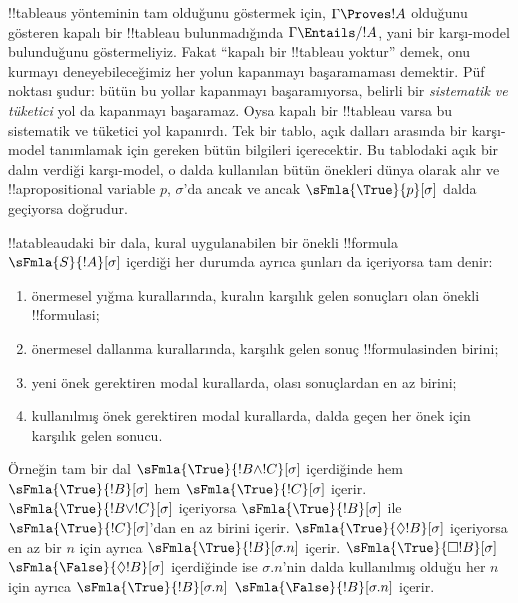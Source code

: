 



\begin{explain}
  !!{tableau}s yönteminin tam olduğunu göstermek için, $\Gamma \Proves !A$
  olduğunu gösteren kapalı bir !!{tableau} bulunmadığında
  $\Gamma \Entails/ !A$, yani bir karşı-model bulunduğunu göstermeliyiz.
  Fakat ``kapalı bir !!{tableau} yoktur'' demek, onu kurmayı deneyebileceğimiz
  her yolun kapanmayı başaramaması demektir. Püf noktası şudur: bütün bu yollar
  kapanmayı başaramıyorsa, belirli bir \emph{sistematik ve tüketici} yol da
  kapanmayı başaramaz. Oysa kapalı bir !!{tableau} varsa bu sistematik ve
  tüketici yol kapanırdı. Tek bir tablo, açık dalları arasında bir karşı-model
  tanımlamak için gereken bütün bilgileri içerecektir. Bu tablodaki açık bir
  dalın verdiği karşı-model, o dalda kullanılan bütün önekleri dünya olarak
  alır ve !!a{propositional variable} $p$, $\sigma$'da ancak ve ancak
  $\sFmla{\True}{p}[\sigma]$ dalda geçiyorsa doğrudur.
\end{explain}

\begin{defn}
  !!a{tableau}{}daki bir dala, kural uygulanabilen bir önekli !!{formula}
  $\sFmla{S}{!A}[\sigma]$ içerdiği her durumda ayrıca şunları da içeriyorsa
  tam denir:
  \begin{enumerate}
    \item önermesel yığma kurallarında, kuralın karşılık gelen sonuçları olan
      önekli !!{formula}s{}i;
    \item önermesel dallanma kurallarında, karşılık gelen sonuç
      !!{formula}s{}inden birini;
    \item yeni önek gerektiren modal kurallarda, olası sonuçlardan en az birini;
    \item kullanılmış önek gerektiren modal kurallarda, dalda geçen her önek
      için karşılık gelen sonucu.
  \end{enumerate}
\end{defn}

\begin{explain}
Örneğin tam bir dal $\sFmla{\True}{!B \land !C}[\sigma]$ içerdiğinde hem
$\sFmla{\True}{!B}[\sigma]$ hem $\sFmla{\True}{!C}[\sigma]$ içerir.
$\sFmla{\True}{!B \lor !C}[\sigma]$ içeriyorsa
$\sFmla{\True}{!B}[\sigma]$ ile $\sFmla{\True}{!C}[\sigma]$'dan en az birini
içerir. 
{$\sFmla{\True}{\Diamond !B}[\sigma]$} içeriyorsa en az bir $n$ için ayrıca
{$\sFmla{\True}{!B}[\sigma.n]$} içerir. 
{$\sFmla{\True}{\Box !B}[\sigma]$}
{$\sFmla{\False}{\Diamond !B}[\sigma]$} içerdiğinde ise $\sigma.n$'nin dalda
kullanılmış olduğu her $n$ için ayrıca 
{$\sFmla{\True}{!B}[\sigma.n]$}
{$\sFmla{\False}{!B}[\sigma.n]$} içerir.
\end{explain}

